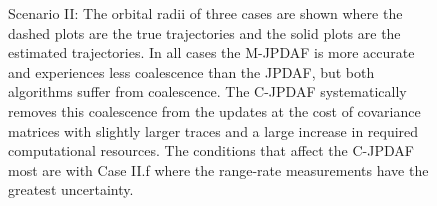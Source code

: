 \begin{figure}
{
\centerline{
	}
\centerline{
	}
\centerline{
	}
}
\caption{Scenario II: The orbital radii of three cases are shown where the dashed plots are the true trajectories and the solid plots are the estimated trajectories.
In all cases the M-JPDAF is more accurate and experiences less coalescence than the JPDAF, but both algorithms suffer from coalescence.
The C-JPDAF systematically removes this coalescence from the updates at the cost of covariance matrices with slightly larger traces and a large increase in required computational resources.
The conditions that affect the C-JPDAF most are with Case II.f where the range-rate measurements have the greatest uncertainty.
}\label{fig:II}
\end{figure}

